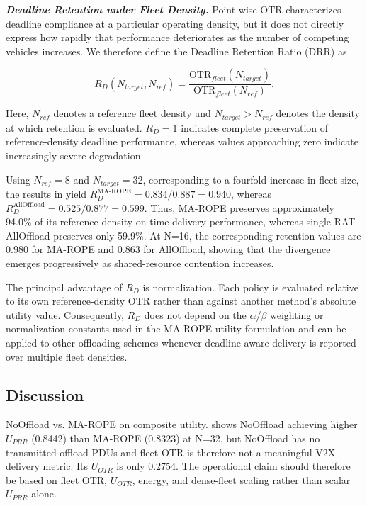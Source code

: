 \textbf{\textit{Deadline Retention under Fleet Density.}} Point-wise OTR characterizes deadline compliance at a particular operating density, but it does not directly express how rapidly that performance deteriorates as the number of competing vehicles increases. We therefore define the Deadline Retention Ratio (DRR) as

\begin{equation}
R_D(N_{target}, N_{ref}) = \frac{\text{OTR}_{fleet}(N_{target})}{\text{OTR}_{fleet}(N_{ref})}.
\label{eq:drr}
\end{equation}

Here, $N_{ref}$ denotes a reference fleet density and $N_{target} > N_{ref}$ denotes the density at which retention is evaluated. $R_D=1$ indicates complete preservation of reference-density deadline performance, whereas values approaching zero indicate increasingly severe degradation.

Using $N_{ref}=8$ and $N_{target}=32$, corresponding to a fourfold increase in fleet size, the results in  yield $R_D^{\text{MA-ROPE}} = 0.834/0.887 = 0.940$, whereas $R_D^{\text{AllOffload}} = 0.525/0.877 = 0.599$. Thus, MA-ROPE preserves approximately 94.0\% of its reference-density on-time delivery performance, whereas single-RAT AllOffload preserves only 59.9\%. At N=16, the corresponding retention values are 0.980 for MA-ROPE and 0.863 for AllOffload, showing that the divergence emerges progressively as shared-resource contention increases.

The principal advantage of $R_D$ is normalization. Each policy is evaluated relative to its own reference-density OTR rather than against another method's absolute utility value. Consequently, $R_D$ does not depend on the $\alpha$/$\beta$ weighting or normalization constants used in the MA-ROPE utility formulation and can be applied to other offloading schemes whenever deadline-aware delivery is reported over multiple fleet densities.

\subsection{Discussion}

NoOffload vs. MA-ROPE on composite utility.  shows NoOffload achieving higher $U_{PRR}$ (0.8442) than MA-ROPE (0.8323) at N=32, but NoOffload has no transmitted offload PDUs and fleet OTR is therefore not a meaningful V2X delivery metric. Its $U_{OTR}$ is only 0.2754. The operational claim should therefore be based on fleet OTR, $U_{OTR}$, energy, and dense-fleet scaling rather than scalar $U_{PRR}$ alone.

